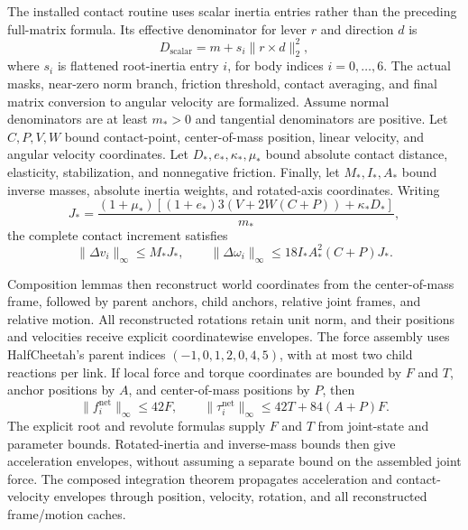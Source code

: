 The installed contact routine uses scalar inertia entries rather than the preceding full-matrix formula.
Its effective denominator for lever $r$ and direction $d$ is
\begin{equation}
 D_{\mathrm{scalar}}=m+s_i\|r\times d\|_2^2,
\end{equation}
where $s_i$ is flattened root-inertia entry $i$, for body indices $i=0,\ldots,6$.
The actual masks, near-zero norm branch, friction threshold, contact averaging, and final matrix conversion to angular velocity are formalized.
Assume normal denominators are at least $m_*>0$ and tangential denominators are positive.
Let $C,P,V,W$ bound contact-point, center-of-mass position, linear velocity, and angular velocity coordinates.
Let $D_*,e_*,\kappa_*,\mu_*$ bound absolute contact distance, elasticity, stabilization, and nonnegative friction.
Finally, let $M_*,I_*,A_*$ bound inverse masses, absolute inertia weights, and rotated-axis coordinates.
Writing
\begin{equation}
 J_* = \frac{(1+\mu_*)[(1+e_*)3(V+2W(C+P))+\kappa_*D_*]}{m_*},
\end{equation}
the complete contact increment satisfies
\begin{equation}
 \|\Delta v_i\|_\infty\le M_*J_*,\qquad
 \|\Delta\omega_i\|_\infty\le18I_*A_*^2(C+P)J_*.
\end{equation}

Composition lemmas then reconstruct world coordinates from the center-of-mass frame, followed by parent anchors, child anchors, relative joint frames, and relative motion.
All reconstructed rotations retain unit norm, and their positions and velocities receive explicit coordinatewise envelopes.
The force assembly uses HalfCheetah's parent indices $(-1,0,1,2,0,4,5)$, with at most two child reactions per link.
If local force and torque coordinates are bounded by $F$ and $T$, anchor positions by $A$, and center-of-mass positions by $P$, then
\begin{equation}
 \|f_i^{\mathrm{net}}\|_\infty\le42F,\qquad
 \|\tau_i^{\mathrm{net}}\|_\infty\le42T+84(A+P)F.
\end{equation}
The explicit root and revolute formulas supply $F$ and $T$ from joint-state and parameter bounds.
Rotated-inertia and inverse-mass bounds then give acceleration envelopes, without assuming a separate bound on the assembled joint force.
The composed integration theorem propagates acceleration and contact-velocity envelopes through position, velocity, rotation, and all reconstructed frame/motion caches.

